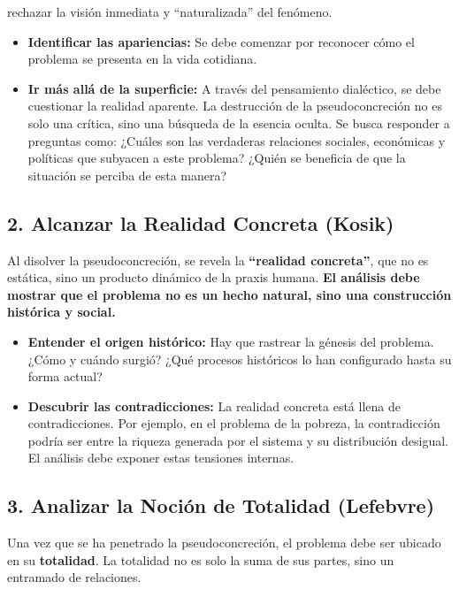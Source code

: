 \documentclass[
  letterpaper,
  DIV=11,
  numbers=noendperiod]{scrreprt}
\begin{document}
rechazar la visión inmediata y ``naturalizada'' del fenómeno.

\begin{itemize}
\item
  \textbf{Identificar las apariencias:} Se debe comenzar por reconocer
  cómo el problema se presenta en la vida cotidiana.
\item
  \textbf{Ir más allá de la superficie:} A través del pensamiento
  dialéctico, se debe cuestionar la realidad aparente. La destrucción de
  la pseudoconcreción no es solo una crítica, sino una búsqueda de la
  esencia oculta. Se busca responder a preguntas como: ¿Cuáles son las
  verdaderas relaciones sociales, económicas y políticas que subyacen a
  este problema? ¿Quién se beneficia de que la situación se perciba de
  esta manera?
\end{itemize}

\subsection{2. Alcanzar la Realidad Concreta
(Kosik)}\label{alcanzar-la-realidad-concreta-kosik-1}

Al disolver la pseudoconcreción, se revela la \textbf{``realidad
concreta''}, que no es estática, sino un producto dinámico de la praxis
humana. \textbf{El análisis debe mostrar que el problema no es un hecho
natural, sino una construcción histórica y social.}

\begin{itemize}
\item
  \textbf{Entender el origen histórico:} Hay que rastrear la génesis del
  problema. ¿Cómo y cuándo surgió? ¿Qué procesos históricos lo han
  configurado hasta su forma actual?
\item
  \textbf{Descubrir las contradicciones:} La realidad concreta está
  llena de contradicciones. Por ejemplo, en el problema de la pobreza,
  la contradicción podría ser entre la riqueza generada por el sistema y
  su distribución desigual. El análisis debe exponer estas tensiones
  internas.
\end{itemize}

\subsection{3. Analizar la Noción de Totalidad
(Lefebvre)}\label{analizar-la-nociuxf3n-de-totalidad-lefebvre}

Una vez que se ha penetrado la pseudoconcreción, el problema debe ser
ubicado en su \textbf{totalidad}. La totalidad no es solo la suma de sus
partes, sino un entramado de relaciones.
\end{document}
